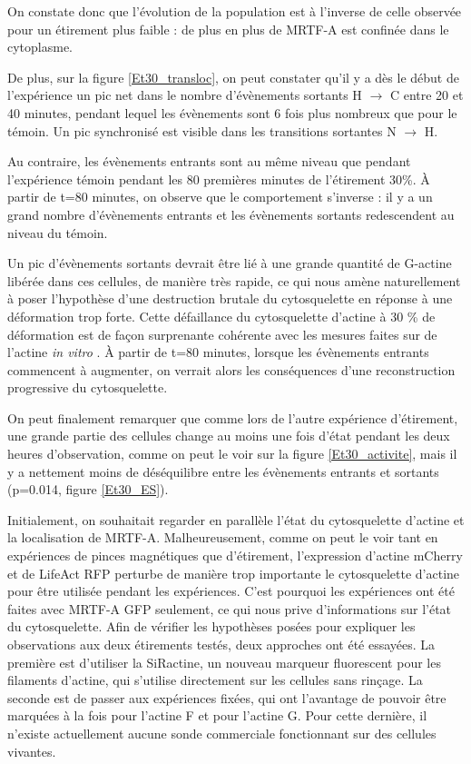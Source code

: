 On constate donc que l'évolution de la population est à l'inverse de celle observée pour un étirement plus faible : de plus en plus de MRTF-A est confinée dans le cytoplasme. 


De plus, sur la figure \ref{Et30_transloc}, on peut constater qu'il y a dès le début de l'expérience un pic net dans le nombre d'évènements sortants H $\rightarrow$ C entre 20 et 40 minutes, pendant lequel les évènements sont 6 fois plus nombreux que pour le témoin. Un pic synchronisé est visible dans les transitions sortantes N $\rightarrow$ H. 

Au contraire, les évènements entrants sont au même niveau que pendant l'expérience témoin pendant les 80 premières minutes de l'étirement 30\%. À partir de t=80 minutes, on observe que le comportement s'inverse : il y a un grand nombre d'évènements entrants et les évènements sortants redescendent au niveau du témoin. 

Un pic d'évènements sortants devrait être lié à une grande quantité de G-actine libérée dans ces cellules, de manière très rapide, ce qui nous amène naturellement à poser l'hypothèse d'une destruction brutale du cytosquelette en réponse à une déformation trop forte. Cette défaillance du cytosquelette d'actine à 30 \% de déformation est de façon surprenante cohérente avec les mesures faites sur de l'actine \textit{in vitro} \cite{janmey_mechanical_1994}. 
À partir de t=80 minutes, lorsque les évènements entrants commencent à augmenter, on verrait alors les conséquences d'une reconstruction progressive du cytosquelette. 

 

On peut finalement remarquer que comme lors de l'autre expérience d'étirement, une grande partie des cellules change au moins une fois d'état pendant les deux heures d'observation, comme on peut le voir sur la figure \ref{Et30_activite}, mais il y a nettement moins de déséquilibre entre les évènements entrants et sortants (p=0.014, figure \ref{Et30_ES}). 

 
 
Initialement, on souhaitait regarder en parallèle l'état du cytosquelette d'actine et la localisation de MRTF-A. 
Malheureusement, comme on peut le voir tant en expériences de pinces magnétiques que d'étirement, l'expression d'actine mCherry et de LifeAct RFP perturbe de manière trop importante le cytosquelette d'actine pour être utilisée pendant les expériences. 
C'est pourquoi les expériences ont été faites avec MRTF-A GFP seulement, ce qui nous prive d'informations sur l'état du cytosquelette.
Afin de vérifier les hypothèses posées pour expliquer les observations aux deux étirements testés, deux approches ont été essayées. La première est d'utiliser la SiRactine, un nouveau marqueur fluorescent pour les filaments d'actine, qui s'utilise directement sur les cellules sans rinçage. 
La seconde est de passer aux expériences fixées, qui ont l'avantage de pouvoir être marquées à la fois pour l'actine F et pour l'actine G. Pour cette dernière, il n'existe actuellement aucune sonde commerciale fonctionnant sur des cellules vivantes. 

